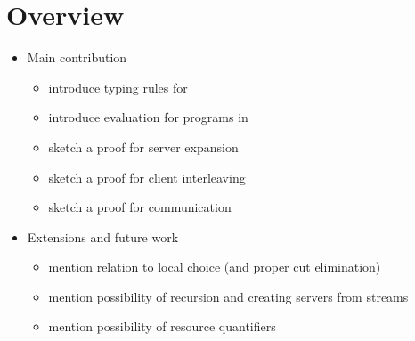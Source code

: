 \documentclass[a4paper,UKenglish]{lipics-v2016}
\begin{document}
\section{Overview}
\begin{itemize}
\item Main contribution
  \begin{itemize}
  \item introduce typing rules for \nodcap
  \item introduce evaluation for programs in \nodcap
  \item sketch a proof for server expansion
  \item sketch a proof for client interleaving
  \item sketch a proof for communication
  \end{itemize}
\item Extensions and future work
  \begin{itemize}
  \item mention relation to local choice (and proper cut elimination)
  \item mention possibility of recursion and creating servers from streams
  \item mention possibility of resource quantifiers
  \end{itemize}
\end{itemize}
\end{document}
